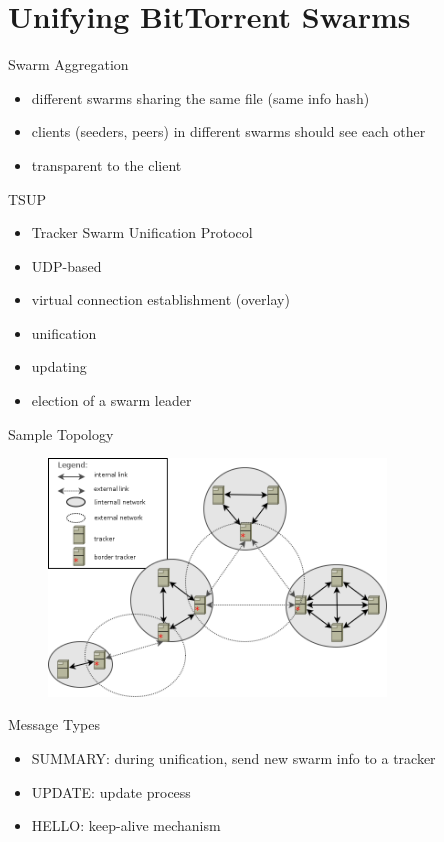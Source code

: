 \documentclass{beamer}
\begin{document}
\section{Unifying BitTorrent Swarms}

\begin{frame}{Swarm Aggregation}
  \begin{itemize}
    \item different swarms sharing the same file (same info hash)
    \item clients (seeders, peers) in different swarms should see each other
    \item transparent to the client
  \end{itemize}
\end{frame}

\begin{frame}{TSUP}
  \begin{itemize}
    \item Tracker Swarm Unification Protocol
    \item UDP-based
    \item virtual connection establishment (overlay)
    \item unification
    \item updating
    \item election of a swarm leader
  \end{itemize}
\end{frame}

\begin{frame}{Sample Topology}
  \begin{figure}
    \includegraphics[width=0.8\textwidth]{img/tracker-networks.png}
  \end{figure}
\end{frame}

\begin{frame}{Message Types}
  \begin{itemize}
    \item SUMMARY: during unification, send new swarm info to a tracker
    \item UPDATE: update process
    \item HELLO: keep-alive mechanism
  \end{itemize}
\end{frame}
\end{document}
